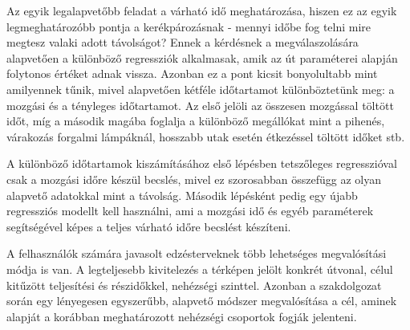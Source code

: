


Az egyik legalapvetőbb feladat a várható idő meghatározása, hiszen ez az egyik legmeghatározóbb pontja a kerékpározásnak - mennyi időbe fog telni mire megtesz valaki adott távolságot? Ennek a kérdésnek a megválaszolására alapvetően a különböző regressziók alkalmasak, amik az út paraméterei alapján folytonos értéket adnak vissza. Azonban ez a pont kicsit bonyolultabb mint amilyennek tűnik, mivel alapvetően kétféle időtartamot különböztetünk meg: a mozgási és a tényleges időtartamot. Az első jelöli az összesen mozgással töltött időt, míg a második magába foglalja a különböző megállókat mint a pihenés, várakozás forgalmi lámpáknál, hosszabb utak esetén étkezéssel töltött időket stb.



A különböző időtartamok kiszámításához első lépésben tetszőleges regresszióval csak a mozgási időre készül becslés, mivel ez szorosabban összefügg  az olyan alapvető adatokkal mint a távolság. Második lépésként pedig egy újabb regressziós modellt kell használni, ami a mozgási idő és egyéb paraméterek segítségével képes a teljes várható időre becslést készíteni.






A felhasználók számára javasolt edzésterveknek több lehetséges megvalósítási módja is van. A legteljesebb kivitelezés a térképen jelölt konkrét útvonal, célul kitűzött teljesítési és részidőkkel, nehézségi szinttel. Azonban a szakdolgozat során egy lényegesen egyszerűbb, alapvető módszer megvalósítása a cél, aminek alapját a korábban meghatározott nehézségi csoportok fogják jelenteni. 

